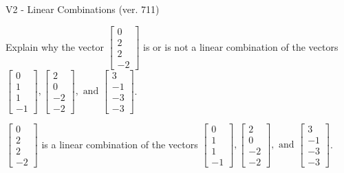 \begin{exercise}
  \begin{exerciseTitle}V2 - Linear Combinations (ver. 711)\end{exerciseTitle}
  \begin{exerciseStatement}
    Explain why the vector \(\left[\begin{array}{c}
0 \\
2 \\
2 \\
-2
\end{array}\right]\)  is or is not a linear 
	combination of the vectors \(\left[\begin{array}{c}
0 \\
1 \\
1 \\
-1
\end{array}\right] , \left[\begin{array}{c}
2 \\
0 \\
-2 \\
-2
\end{array}\right] , \text{ and } \left[\begin{array}{c}
3 \\
-1 \\
-3 \\
-3
\end{array}\right]\).
	


  \end{exerciseStatement}
  \begin{exerciseAnswer}
   \(\left[\begin{array}{c}
0 \\
2 \\
2 \\
-2
\end{array}\right]\) 
  	 is  
	a linear combination of the vectors \(\left[\begin{array}{c}
0 \\
1 \\
1 \\
-1
\end{array}\right] , \left[\begin{array}{c}
2 \\
0 \\
-2 \\
-2
\end{array}\right] , \text{ and } \left[\begin{array}{c}
3 \\
-1 \\
-3 \\
-3
\end{array}\right]\).

	
  


  \end{exerciseAnswer}
\end{exercise}